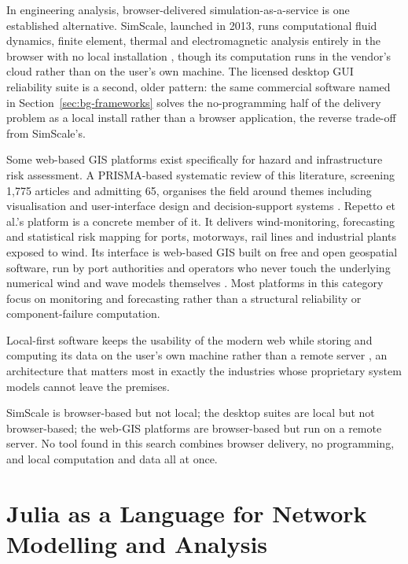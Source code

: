\documentclass[12pt]{report}
\begin{document}
In engineering analysis, browser-delivered simulation-as-a-service is one established
alternative. SimScale, launched in 2013, runs computational fluid dynamics, finite element,
thermal and electromagnetic analysis entirely in the browser with no local installation
\cite{simscale}, though its computation runs in the vendor's cloud rather than on the user's own
machine. The licensed desktop {GUI} reliability suite is a second, older pattern: the same
commercial software named in Section~\ref{sec:bg-frameworks} solves the no-programming half of
the delivery problem as a local install rather than a browser application, the reverse
trade-off from SimScale's.

Some web-based {GIS} platforms exist specifically for hazard and infrastructure risk assessment.
A {PRISMA}-based systematic review of this literature, screening 1{,}775 articles and admitting
65, organises the field around themes including visualisation and user-interface design and
decision-support systems \cite{daud2024webgis}. Repetto et al.'s platform is a concrete member of
it. It delivers wind-monitoring, forecasting and statistical risk mapping for ports, motorways,
rail lines and industrial plants exposed to wind. Its interface is web-based {GIS} built on free
and open geospatial software, run by port authorities and operators who never touch the
underlying numerical wind and wave models themselves \cite{repetto2018windgis}. Most platforms
in this category focus on monitoring and forecasting rather than a structural reliability or
component-failure computation.

Local-first software keeps the usability of the modern web while storing and computing its data
on the user's own machine rather than a remote server \cite{kleppmann2019local}, an architecture
that matters most in exactly the industries whose proprietary system models cannot leave the
premises.

SimScale is browser-based but not local; the desktop suites are local but not browser-based; the
web-{GIS} platforms are browser-based but run on a remote server. No tool found in this search
combines browser delivery, no programming, and local computation and data all at once.

\section{Julia as a Language for Network Modelling and Analysis}
\label{sec:bg-language}
\end{document}
